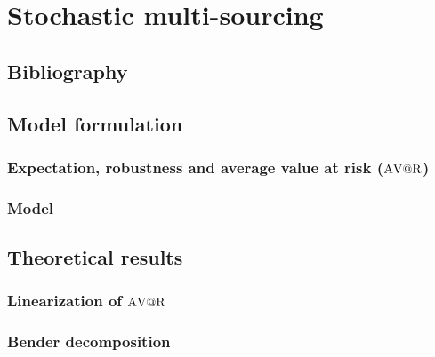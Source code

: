 \chapter{Stochastic multi-sourcing}


\section{Bibliography}


\section{Model formulation}

\subsection{Expectation, robustness and average value at risk ($\mathrm{A\mathrm{V@R}}$)}


\subsection{Model}


\section{Theoretical results}

\subsection{Linearization of $\mathrm{A\mathrm{V@R}}$}

\subsection{Bender decomposition}



